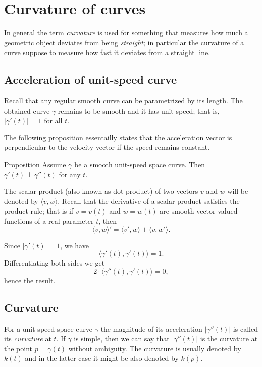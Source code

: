 \chapter{Curvature of curves}


In general the term \emph{curvature} is used for something that measures how much 
a geometric object deviates from being \emph{straight};
in particular the curvature of a curve suppose to measure how fast it deviates from a straight line.

\section*{Acceleration of unit-speed curve}

Recall that any regular smooth curve can be parametrized by its length.
The obtained curve $\gamma$ remains to be smooth and it has unit speed; 
that is, $|\gamma'(t)|=1$ for all $t$.

The following proposition essentailly states that the acceleration vector is perpendicular to the velocity vector if the speed remains constant.

\begin{thm}{Proposition}\label{prop:a'-pertp-a''}
Assume $\gamma$ be a smooth unit-speed space curve.
Then $\gamma'(t)\perp \gamma''(t)$ for any $t$.
\end{thm}

The scalar product (also known as dot product) of two vectors $v$ and $w$ will be denoted by $\langle v,w\rangle$.
Recall that the derivative of a scalar product satisfies the product rule;
that is if $v=v(t)$ and $w=w(t)$ are smooth vector-valued functions of a real parameter $t$, then
\[\langle v,w\rangle'=\langle v',w\rangle+\langle v,w'\rangle.\]

Since $|\gamma'(t)|=1$, we have
\[\langle\gamma'(t),\gamma'(t)\rangle=1.\]
Differentiating both sides we get
\[2\cdot\langle\gamma''(t),\gamma'(t)\rangle=0,\]
hence the result.
\qeds

\section*{Curvature}

For a unit speed space curve $\gamma$ the magnitude of its acceleration $|\gamma''(t)|$ is called its \emph{curvature} at $t$.
If $\gamma$ is simple, then we can say that $|\gamma''(t)|$ is the curvature at the point $p=\gamma(t)$ without ambiguity.
The curvature is usually denoted by $k(t)$ and in the latter case it might be also denoted by $k(p)$.

